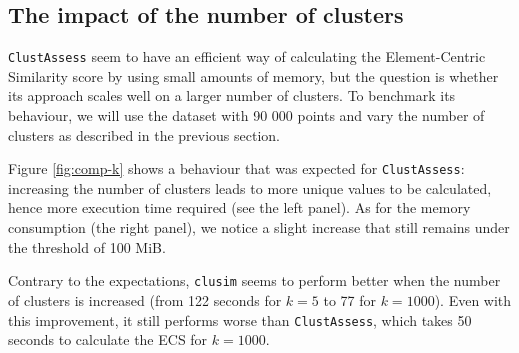 \begin{table}[]

\caption{\label{tab:comp-mem} Memory in GiB}
\end{table}

\subsection{The impact of the number of clusters}
\verb|ClustAssess| seem to have an efficient way of calculating the Element-Centric Similarity score by using small amounts of memory, but the question is whether its approach scales well on a larger number of clusters. To benchmark its behaviour, we will use the dataset with 90 000 points and vary the number of clusters as described in the previous section.

Figure \ref{fig:comp-k} shows a behaviour that was expected for \verb|ClustAssess|: increasing the number of clusters leads to more unique values to be calculated, hence more execution time required (see the left panel). As for the memory consumption (the right panel), we notice a slight increase that still remains under the threshold of 100 MiB.

Contrary to the expectations, \verb|clusim| seems to perform better when the number of clusters is increased (from 122 seconds for $k = 5$ to 77 for $k = 1000$). Even with this improvement, it still performs worse than \verb|ClustAssess|, which takes 50 seconds to calculate the ECS for $k = 1000$.

